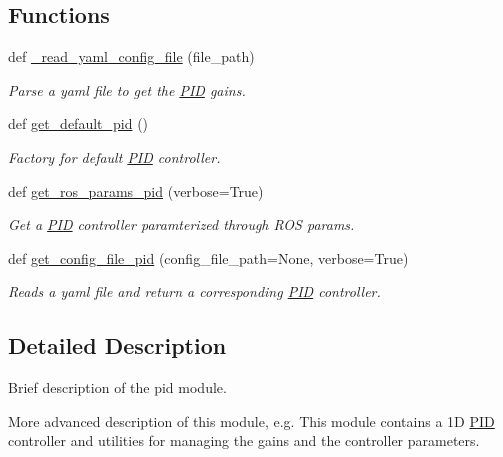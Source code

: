 \subsection*{Functions}
\begin{DoxyCompactItemize}
\item 
def \hyperlink{namespaceci__example__python_1_1pid_ae3cae0234e7c25f408cddd004494c5ca}{\+\_\+read\+\_\+yaml\+\_\+config\+\_\+file} (file\+\_\+path)
\begin{DoxyCompactList}\small\item\em Parse a yaml file to get the \hyperlink{classci__example__python_1_1pid_1_1PID}{P\+ID} gains. \end{DoxyCompactList}\item 
def \hyperlink{namespaceci__example__python_1_1pid_a6fc811a84ce986b8315aabae71987cbf}{get\+\_\+default\+\_\+pid} ()
\begin{DoxyCompactList}\small\item\em Factory for default \hyperlink{classci__example__python_1_1pid_1_1PID}{P\+ID} controller. \end{DoxyCompactList}\item 
def \hyperlink{namespaceci__example__python_1_1pid_ae1f8a5e73e269ede0bdd4d0daf2f265e}{get\+\_\+ros\+\_\+params\+\_\+pid} (verbose=True)
\begin{DoxyCompactList}\small\item\em Get a \hyperlink{classci__example__python_1_1pid_1_1PID}{P\+ID} controller paramterized through R\+OS params. \end{DoxyCompactList}\item 
def \hyperlink{namespaceci__example__python_1_1pid_a18376955fadc78cf60e9836c120adc9a}{get\+\_\+config\+\_\+file\+\_\+pid} (config\+\_\+file\+\_\+path=None, verbose=True)
\begin{DoxyCompactList}\small\item\em Reads a yaml file and return a corresponding \hyperlink{classci__example__python_1_1pid_1_1PID}{P\+ID} controller. \end{DoxyCompactList}\end{DoxyCompactItemize}


\subsection{Detailed Description}
Brief description of the pid module. 

More advanced description of this module, e.\+g. This module contains a 1D \hyperlink{classci__example__python_1_1pid_1_1PID}{P\+ID} controller and utilities for managing the gains and the controller parameters. 


